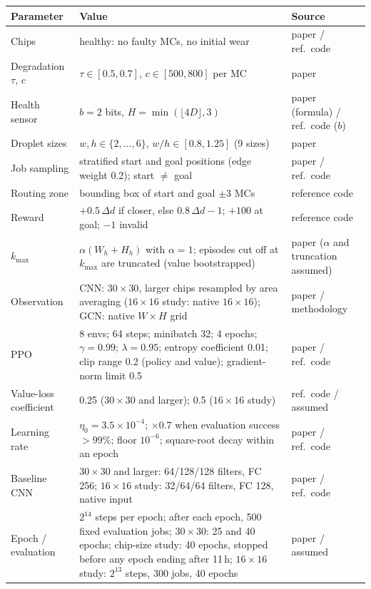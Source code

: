\documentclass[11pt,a4paper]{article}
\begin{document}
\begin{table}[H]
\centering\small
\begin{tabularx}{\textwidth}{lXl}
\toprule
Parameter & Value & Source \\ \midrule
Chips & healthy: no faulty MCs, no initial wear & paper / ref.\ code \\
Degradation $\tau$, $c$ & $\tau\in[0.5,0.7]$, $c\in[500,800]$ per MC & paper \\
Health sensor & $b=2$ bits, $H=\min(\lfloor 4D\rfloor,3)$ & paper (formula) / ref.\ code ($b$) \\
Droplet sizes & $w,h\in\{2,\dots,6\}$, $w/h\in[0.8,1.25]$ (9 sizes) & paper \\
Job sampling & stratified start and goal positions (edge weight 0.2); start $\neq$ goal & paper / ref.\ code \\
Routing zone & bounding box of start and goal $\pm3$ MCs & reference code \\
Reward & $+0.5\,\Delta d$ if closer, else $0.8\,\Delta d-1$; $+100$ at goal; $-1$ invalid & reference code \\
$k_{\max}$ & $\alpha(W_h+H_h)$ with $\alpha=1$; episodes cut off at $k_{\max}$ are truncated (value bootstrapped) & paper ($\alpha$ and truncation assumed) \\
Observation & CNN: $30\times30$, larger chips resampled by area averaging ($16\times16$ study: native $16\times16$); GCN: native $W\times H$ grid & paper / methodology \\
PPO & 8 envs; 64 steps; minibatch 32; 4 epochs; $\gamma=0.99$; $\lambda=0.95$; entropy coefficient 0.01; clip range 0.2 (policy and value); gradient-norm limit 0.5 & paper / ref.\ code \\
Value-loss coefficient & 0.25 ($30\times30$ and larger); 0.5 ($16\times16$ study) & ref.\ code / assumed \\
Learning rate & $\eta_0=3.5\times10^{-4}$; $\times0.7$ when evaluation success $>99\%$; floor $10^{-6}$; square-root decay within an epoch & paper / ref.\ code \\
Baseline CNN & $30\times30$ and larger: 64/128/128 filters, FC 256; $16\times16$ study: 32/64/64 filters, FC 128, native input & paper / ref.\ code \\
Epoch / evaluation & $2^{14}$ steps per epoch; after each epoch, 500 fixed evaluation jobs; $30\times30$: 25 and 40 epochs; chip-size study: 40 epochs, stopped before any epoch ending after 11\,h; $16\times16$ study: $2^{13}$ steps, 300 jobs, 40 epochs & paper / assumed \\

\end{tabularx}
\end{table}
\end{document}
